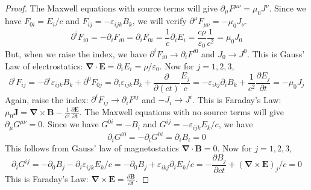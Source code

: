 \documentclass[a4paper]{article}
\theoremstyle{new}
\begin{document}
\begin{proof}
The Maxwell equations with source terms will give $\partial_\mu F^{\mu\nu}=\mu_0J^\nu$. Since we have $F_{0i}=E_i/c$ and $F_{ij}=-\varepsilon_{ijk}B_k$, we will verify $\partial^\mu F_{\mu\nu}=-\mu_0J_\nu$.
$$\partial^iF_{i0}=-\partial_iF_{i0}=\partial_iF_{0i}=\frac{1}{c}\partial_iE_i=\frac{c\rho}{\varepsilon_0}\frac{1}{c^2}=\mu_0J_0$$
But, when we raise the index, we have $\partial^iF_{i0}\rightarrow\partial_iF^{i0}$ and $J_0\rightarrow J^0$. This is Gauss' Law of electrostatics: $\boldsymbol{\nabla}\cdot\mathbf{E}=\partial_iE_i=\rho/\varepsilon_0$. Now for $j=1,2,3$,
$$\partial^iF_{ij}=-\partial^i\varepsilon_{ijk}B_k+\partial^0F_{0j}=\partial_i\varepsilon_{ijk}B_k+\frac{\partial}{\partial(ct)}\frac{E_j}{c}=-\varepsilon_{ikj}\partial_iB_k+\frac{1}{c^2}\frac{\partial E_j}{\partial t}=-\mu_0J_j$$
Again, raise the index: $\partial^iF_{ij}\rightarrow\partial_iF^{ij}$ and $-J_i\rightarrow J^i$. This is Faraday's Law: $\mu_0\mathbf{J}=\boldsymbol{\nabla}\times\mathbf{B}-\frac{1}{c^2}\frac{\partial\mathbf{E}}{\partial t}$. The Maxwell equations with no source terms will give $\partial_\mu G^{\mu\nu}=0$. Since we have $G^{0i}=-B_i$ and $G^{ij}=-\varepsilon_{ijk}E_k/c$, we have
$$\partial_iG^{i0}=-\partial_iG^{0i}=\partial_iB_i=0$$
This follows from Gauss' law of magnetostatics $\boldsymbol{\nabla}\cdot\mathbf{B}=0$. Now for $j=1,2,3$,
$$\partial_iG^{ij}=-\partial_0B_j-\partial_i\varepsilon_{ijk}E_k/c=-\partial_0B_j+\varepsilon_{ikj}\partial_iE_k/c=-\frac{\partial B_j}{\partial ct}+(\boldsymbol{\nabla}\times\mathbf{E})_j/c=0$$
This is Faraday's Law: $\boldsymbol{\nabla}\times\mathbf{E}=\frac{\partial\mathbf{B}}{\partial t}$.
\end{proof}
\end{document}
